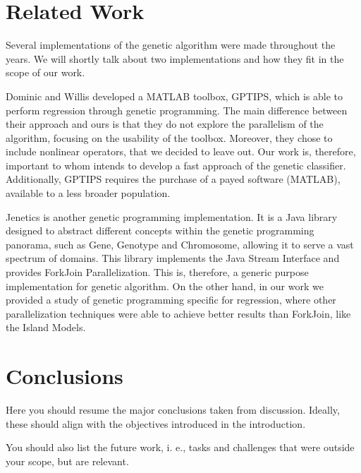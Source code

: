 \documentclass[runningheads]{llncs}
\begin{document}
\section{Related Work}

Several implementations of the genetic algorithm were made throughout the years. We will shortly talk about two implementations and how they fit in the scope of our work.

Dominic and Willis  \cite{GPTIPS} developed a MATLAB toolbox, GPTIPS, which is able to perform regression through genetic programming. The main difference between their approach and  ours is that they do not explore the parallelism of the algorithm, focusing on the usability of the toolbox. Moreover, they chose to include nonlinear operators, that we decided to leave out. Our work is, therefore, important to whom intends to develop a fast approach of the genetic classifier. Additionally, GPTIPS requires the purchase of a payed software (MATLAB), available to a less broader population.

Jenetics \cite{jenetics} is another genetic programming implementation. It is a Java library designed to abstract different concepts within the genetic programming panorama, such as Gene, Genotype and Chromosome, allowing it to serve a vast spectrum of domains. This library implements the Java Stream Interface and provides ForkJoin Parallelization. This is, therefore, a generic purpose implementation for genetic algorithm. On the other hand, in our work we provided a study of genetic programming specific for regression, where other parallelization techniques were able to achieve better results than ForkJoin, like the Island Models.

\section{Conclusions}

Here you should resume the major conclusions taken from discussion. Ideally, these should align with the objectives introduced in the introduction.


You should also list the future work, i. e., tasks and challenges that were outside your scope, but are relevant.

\end{document}
